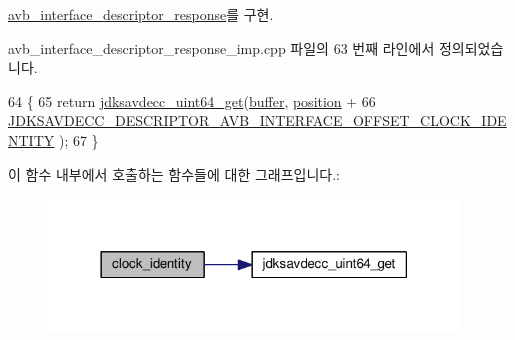 \hyperlink{classavdecc__lib_1_1avb__interface__descriptor__response_a25301d8ad0be863448197df63d847666}{avb\+\_\+interface\+\_\+descriptor\+\_\+response}를 구현.



avb\+\_\+interface\+\_\+descriptor\+\_\+response\+\_\+imp.\+cpp 파일의 63 번째 라인에서 정의되었습니다.


\begin{DoxyCode}
64 \{
65     \textcolor{keywordflow}{return} \hyperlink{group__endian_gac8c2b48b7d7db101708e0197e366ac42}{jdksavdecc\_uint64\_get}(\hyperlink{classavdecc__lib_1_1descriptor__response__base__imp_a56ed84df35de10bdb65e72b184309497}{buffer}, \hyperlink{classavdecc__lib_1_1descriptor__response__base__imp_a7a04afe5347934be732ec70a70bd0a28}{position} +
66                                              
      \hyperlink{group__descriptor__avb__interface_ga1cc78ff4c9e5d72a289d83d1606071ec}{JDKSAVDECC\_DESCRIPTOR\_AVB\_INTERFACE\_OFFSET\_CLOCK\_IDENTITY}
      );
67 \}
\end{DoxyCode}


이 함수 내부에서 호출하는 함수들에 대한 그래프입니다.\+:
\nopagebreak
\begin{figure}[H]
\begin{center}
\leavevmode
\includegraphics[width=309pt]{classavdecc__lib_1_1avb__interface__descriptor__response__imp_aa558cf7e44c868a7a97e5ca8f6a410ae_cgraph}
\end{center}
\end{figure}


